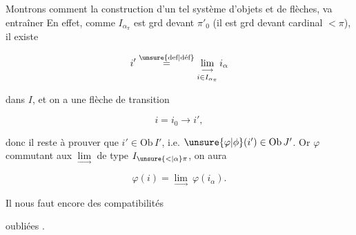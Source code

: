 
Montrons comment la construction d'un tel système d'objets et de flèches,  va entraîner    En effet, comme $I_{\alpha_\pi}$ est grd devant $\pi'_0$ (il est grd devant  cardinal $<\pi$),  il existe

\[
i'\overset{\text{\unsure{def|déf}}}{=}\underset{i\in I_{\alpha_\pi}}{\underset{\longrightarrow}{\lim}}\,i_\alpha
\]

dans $I$, et on a une flèche de transition

\[
i=i_0\longrightarrow i',
\]

donc il reste à prouver que $i'\in\mathrm{Ob}\,I'$, i.e. $\unsure{\varphi|\phi}(i')\in\mathrm{Ob}\,J'$. Or $\varphi$ commutant aux $\underset{\longrightarrow}{\lim}$ de type $I_{\unsure{<|\alpha}\pi}$, on aura

\[
\varphi(i)=\underset{\longrightarrow}{\lim}\ \varphi(i_\alpha).
\]

Il nous faut encore des compatibilités


oubliées .

